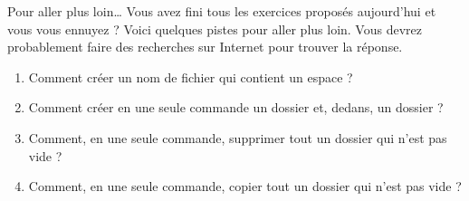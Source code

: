 \documentclass[a4paper,11pt]{style-esi/td}
\begin{document}
	\begin{Exercice}{Pour aller plus loin\dots}
		Vous avez fini tous les exercices proposés aujourd'hui
		et vous vous ennuyez ?
		Voici quelques pistes pour aller plus loin.
		Vous devrez probablement faire des recherches sur Internet
		pour trouver la réponse.
		\begin{enumerate}
		\item 
			Comment créer un nom de fichier qui contient un espace ?
		\item 
			Comment créer en une seule commande un dossier 
			et, dedans, un dossier  ?
		\item 
			Comment, en une seule commande, 
			supprimer tout un dossier qui n'est pas vide ?
		\item 
			Comment, en une seule commande, 
			copier tout un dossier qui n'est pas vide ?
		\end{enumerate}
	\end{Exercice}
\end{document}
